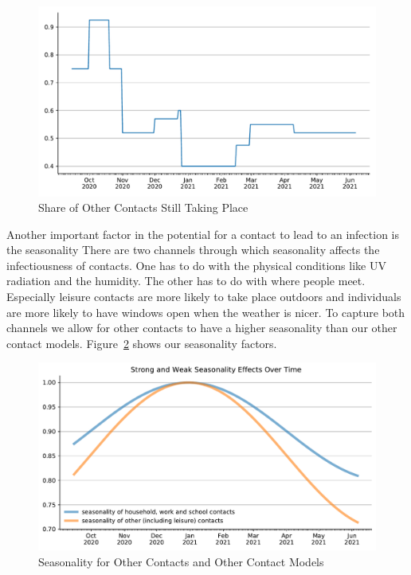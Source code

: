 \begin{figure}
\centering
\includegraphics[width=\textwidth]{../figures/results/figures/data/other_multiplier}
\caption{Share of Other Contacts Still Taking Place}
\label{fig:other_multiplier}
\floatfoot{\noindent}
\end{figure}

Another important factor in the potential for a contact to lead to an infection is the
seasonality \citep{Kuehn2020} There are two channels through which
seasonality affects the infectiousness of contacts. One has to do with the physical
conditions like UV radiation and the humidity. The other has to do with where people
meet. Especially leisure contacts are more likely to take place outdoors and individuals
are more likely to have windows open when the weather is nicer. To capture both channels
we allow for other contacts to have a higher seasonality than our other contact models.
Figure~\ref{fig:seasonality} shows our seasonality factors.

\begin{figure}
\centering
\includegraphics[width=\textwidth]{../figures/results/figures/data/seasonality}
\caption{Seasonality for Other Contacts and Other Contact Models}
\label{fig:seasonality}
\floatfoot{\noindent}
\end{figure}



